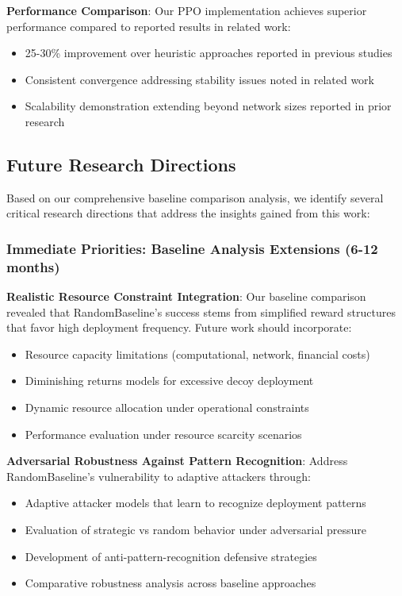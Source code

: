 \documentclass[12pt,oneside]{article}
\begin{document}
\textbf{Performance Comparison}:
Our PPO implementation achieves superior performance compared to reported results in related work:
\begin{itemize}
    \item 25-30\% improvement over heuristic approaches reported in previous studies
    \item Consistent convergence addressing stability issues noted in related work
    \item Scalability demonstration extending beyond network sizes reported in prior research
\end{itemize}

\subsection{Future Research Directions}

Based on our comprehensive baseline comparison analysis, we identify several critical research directions that address the insights gained from this work:

\subsubsection{Immediate Priorities: Baseline Analysis Extensions (6-12 months)}

\textbf{Realistic Resource Constraint Integration}: Our baseline comparison revealed that RandomBaseline's success stems from simplified reward structures that favor high deployment frequency. Future work should incorporate:
\begin{itemize}
\item Resource capacity limitations (computational, network, financial costs)
\item Diminishing returns models for excessive decoy deployment
\item Dynamic resource allocation under operational constraints
\item Performance evaluation under resource scarcity scenarios
\end{itemize}

\textbf{Adversarial Robustness Against Pattern Recognition}: Address RandomBaseline's vulnerability to adaptive attackers through:
\begin{itemize}
\item Adaptive attacker models that learn to recognize deployment patterns
\item Evaluation of strategic vs random behavior under adversarial pressure
\item Development of anti-pattern-recognition defensive strategies
\item Comparative robustness analysis across baseline approaches
\end{itemize}
\end{document}

